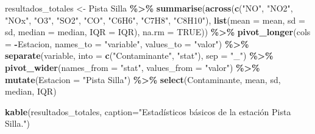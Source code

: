 \documentclass[
]{article}
\newenvironment{Shaded}{\begin{snugshade}}{\end{snugshade}}
\newcommand{\AttributeTok}[1]{\textcolor[rgb]{0.13,0.29,0.53}{#1}}
\newcommand{\ConstantTok}[1]{\textcolor[rgb]{0.56,0.35,0.01}{#1}}
\newcommand{\FunctionTok}[1]{\textcolor[rgb]{0.13,0.29,0.53}{\textbf{#1}}}
\newcommand{\NormalTok}[1]{#1}
\newcommand{\OtherTok}[1]{\textcolor[rgb]{0.56,0.35,0.01}{#1}}
\newcommand{\SpecialCharTok}[1]{\textcolor[rgb]{0.81,0.36,0.00}{\textbf{#1}}}
\newcommand{\StringTok}[1]{\textcolor[rgb]{0.31,0.60,0.02}{#1}}
\begin{document}
\begin{Shaded}
\begin{Highlighting}[]
\NormalTok{resultados\_totales }\OtherTok{\textless{}{-}} \StringTok{\textasciigrave{}}\AttributeTok{Pista Silla}\StringTok{\textasciigrave{}} \SpecialCharTok{\%\textgreater{}\%}
  \FunctionTok{summarise}\NormalTok{(}\FunctionTok{across}\NormalTok{(}\FunctionTok{c}\NormalTok{(}\StringTok{"NO"}\NormalTok{, }\StringTok{"NO2"}\NormalTok{, }\StringTok{"NOx"}\NormalTok{, }\StringTok{"O3"}\NormalTok{, }\StringTok{"SO2"}\NormalTok{, }\StringTok{"CO"}\NormalTok{, }\StringTok{"C6H6"}\NormalTok{, }\StringTok{"C7H8"}\NormalTok{, }\StringTok{"C8H10"}\NormalTok{), }
                   \FunctionTok{list}\NormalTok{(}\AttributeTok{mean =}\NormalTok{ mean, }\AttributeTok{sd =}\NormalTok{ sd, }
    \AttributeTok{median =}\NormalTok{ median, }\AttributeTok{IQR =}\NormalTok{ IQR), }\AttributeTok{na.rm =} \ConstantTok{TRUE}\NormalTok{)) }\SpecialCharTok{\%\textgreater{}\%}
  \FunctionTok{pivot\_longer}\NormalTok{(}\AttributeTok{cols =} \SpecialCharTok{{-}}\NormalTok{Estacion, }\AttributeTok{names\_to =} \StringTok{"variable"}\NormalTok{, }\AttributeTok{values\_to =} \StringTok{"valor"}\NormalTok{) }\SpecialCharTok{\%\textgreater{}\%}
  \FunctionTok{separate}\NormalTok{(variable, }\AttributeTok{into =} \FunctionTok{c}\NormalTok{(}\StringTok{"Contaminante"}\NormalTok{, }\StringTok{"stat"}\NormalTok{), }\AttributeTok{sep =} \StringTok{"\_"}\NormalTok{) }\SpecialCharTok{\%\textgreater{}\%}
  \FunctionTok{pivot\_wider}\NormalTok{(}\AttributeTok{names\_from =} \StringTok{"stat"}\NormalTok{, }\AttributeTok{values\_from =} \StringTok{"valor"}\NormalTok{) }\SpecialCharTok{\%\textgreater{}\%}
  \FunctionTok{mutate}\NormalTok{(}\AttributeTok{Estacion =} \StringTok{"Pista Silla"}\NormalTok{) }\SpecialCharTok{\%\textgreater{}\%}
  \FunctionTok{select}\NormalTok{(Contaminante, mean, sd, median, IQR) }

\FunctionTok{kable}\NormalTok{(resultados\_totales, }\AttributeTok{caption=}\StringTok{"Estadísticos básicos de la estación Pista Silla."}\NormalTok{)}
\end{Highlighting}
\end{Shaded}
\end{document}
